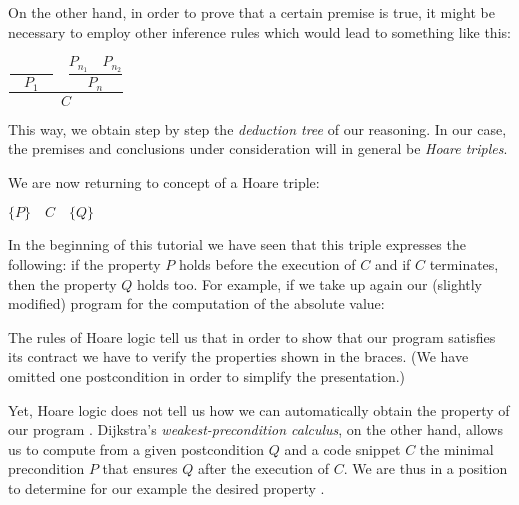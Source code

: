 On the other hand, in order to prove that a certain premise is true, it
might be necessary to employ other inference rules which would lead to
something like this:




\begin{center}
$\dfrac{\dfrac{}{\quad P_1\quad} \quad \dfrac{P_{n_1}\quad P_{n_2}}{P_n}}{C}$


\end{center}


This way, we obtain step by step the \emph{deduction tree} of our
reasoning. In our case, the premises and conclusions under consideration
will in general be \emph{Hoare triples}.





We are now returning to concept of a Hoare triple:




\begin{center}
$\{ P \}\quad  C\quad \{ Q \}$


\end{center}


In the beginning of this tutorial we have seen that this triple
expresses the following: if the property $P$ holds before the
execution of $C$ and if $C$ terminates, then the property $Q$
holds too. For example, if we take up again our (slightly modified)
program for the computation of the absolute value:






The rules of Hoare logic tell us that in order to show that our program
satisfies its contract we have to verify the properties shown in the
braces. (We have omitted one postcondition in order to simplify the
presentation.)






Yet, Hoare logic does not tell us how we can automatically obtain the
property  of our program . Dijkstra's
\emph{weakest-precondition calculus}, on the other hand, allows us to
compute from a given postcondition $Q$ and a code snippet $C$ the
minimal precondition $P$ that ensures $Q$ after the execution of
$C$. We are thus in a position to determine for our example
 the desired property .





